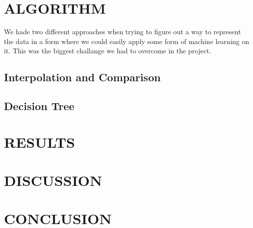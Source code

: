 \documentclass[a4paper, 10pt, conference]{ieeeconf}      %
\begin{document}
\section{ALGORITHM}
We hade two different approaches when trying to figure out a way to represent the data in a form where we could easily apply some form of machine learning on it. This was the biggest challange we had to overcome in the project. 
\subsection{Interpolation and Comparison}

\subsection{Decision Tree}

\section{RESULTS}

\section{DISCUSSION}

\section{CONCLUSION}













\end{document}

